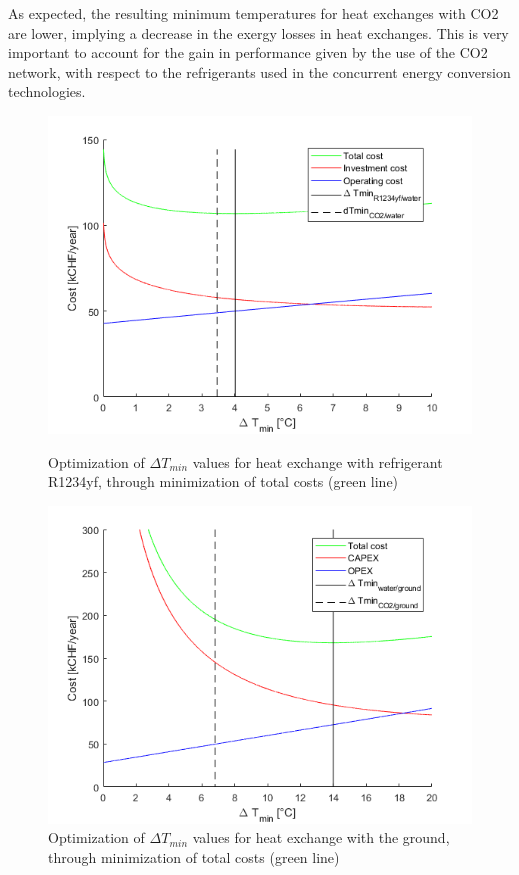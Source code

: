 \documentclass{article}
\begin{document}
As expected, the resulting minimum temperatures for heat exchanges with CO2 are lower, implying a decrease in the exergy losses in heat exchanges. This is very important to account for the gain in performance given by the use of the CO2 network, with respect to the refrigerants used in the concurrent energy conversion technologies.

\begin{figure}[!htb]
	\centering
	\begin{minipage}{.45\textwidth}
		\centering
		\includegraphics[width=\linewidth]{dtmin_wr}
		\caption{Optimization of $\Delta T_{min}$ values for heat exchange with refrigerant R1234yf, through minimization of total costs (green line)}
		\label{fig:dtmin_wr}
	\end{minipage}%
	\hspace{1cm}
	\begin{minipage}{0.45\textwidth}
		\centering
		\includegraphics[width=\linewidth]{dtmin_gtw}
		\caption{Optimization of $\Delta T_{min}$ values for heat exchange with the ground, through minimization of total costs (green line)}
		\label{fig:dtmin_gtw}
	\end{minipage}
\end{figure}
\end{document}
